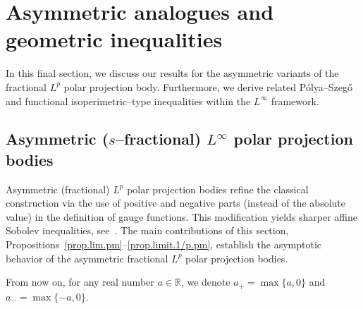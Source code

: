 \documentclass[11pt, reqno]{article}
\theoremstyle{definition}
\numberwithin{equation}{section}
\newcommand{\R}{\mathbb{R}}
\newcommand{\vtil}{\widetilde{\mathrm{V}}}
\begin{document}


\section{Asymmetric analogues and geometric inequalities}\label{sec:asymmetric}

In this final section, we discuss our results for the asymmetric variants of the fractional $L^p$ polar projection body.
Furthermore, we derive related P\'olya--Szeg\H{o} and functional isoperimetric--type inequalities within the $L^\infty$ framework.

\subsection{Asymmetric ($s$--fractional) $L^\infty$ polar projection bodies}

Asymmetric (fractional) $L^p$ polar projection bodies refine the classical construction via the use of positive and negative parts (instead of the absolute value) in the definition of gauge functions.
This modification yields sharper affine Sobolev inequalities, see~\cite{HS_2009, HL_2024}.
The main contributions of this section, Propositions~\ref{prop.lim.pm}--\ref{prop.limit.1/p.pm}, establish the asymptotic behavior of the asymmetric fractional $L^p$ polar projection bodies.

\medskip

From now on, for any real number $a \in \R$, we denote $a_+ = \max \{ a, 0 \}$ and $a_- = \max \{ -a , 0 \}$.
\end{document}
